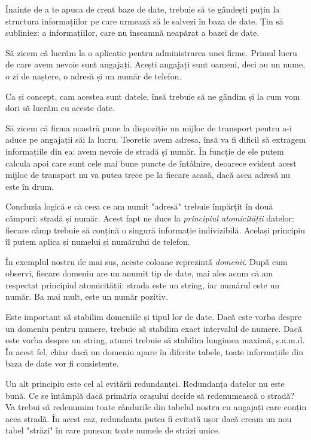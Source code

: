 Înainte de a te apuca de creat baze de date, trebuie să te gândești puțin
la structura informațiilor pe care urmează să le salvezi în baza de date.
Țin să subliniez: a informațiilor, care nu înseamnă neapărat a bazei de date.

Să zicem că lucrăm la o aplicație pentru administrarea unei firme. Primul
lucru de care avem nevoie sunt angajați. Acești angajați sunt oameni, deci
au un nume, o zi de naștere, o adresă și un număr de telefon.

Ca și concept, cam acestea sunt datele, însă trebuie să ne gândim și la cum
vom dori să lucrăm cu aceste date.

Să zicem că firma noastră pune la dispoziție un mijloc de transport pentru
a-i aduce pe angajații săi la lucru. Teoretic avem adresa, însă va fi dificil
să extragem informațiile din ea: avem nevoie de stradă și număr. În funcție de
ele putem calcula apoi care sunt cele mai bune puncte de întâlnire, deoarece
evident acest mijloc de transport nu va putea trece pe la fiecare acasă, dacă
acea adresă nu este în drum.

Concluzia logică e că ceea ce am numit "adresă" trebuie împărțit în două câmpuri:
stradă și număr. Acest fapt ne duce la \textsl{principiul atomicității}
datelor: fiecare
câmp trebuie să conțină o singură informație indivizibilă. Același principiu îl
putem aplica și numelui și numărului de telefon.

În exemplul nostru de mai sus, aceste coloane reprezintă \textsl{domenii}. După
cum observi, fiecare domeniu are un anumit tip de date, mai ales acum că am
respectat principiul atomicității: strada este un string, iar numărul este un
număr. Ba mai mult, este un număr pozitiv.

Este important să stabilim domeniile și tipul lor de date. Dacă este vorba despre
un domeniu pentru numere, trebuie să stabilim exact intervalul de numere. Dacă
este vorba despre un string, atunci trebuie să stabilim lungimea maximă, ș.a.m.d.
În acest fel, chiar dacă un domeniu apare în diferite tabele, toate informațiile
din baza de date vor fi consistente.

Un alt principiu este cel al evitării redundanței. Redundanța datelor nu este
bună. Ce se întâmplă dacă primăria orașului decide să redenumească o stradă?
Va trebui să redenumim toate rândurile din tabelul nostru cu angajați care
conțin acea stradă. În acest caz, redundanța putea fi evitată ușor dacă
cream un nou tabel "străzi" în care puneam toate numele de străzi unice.

